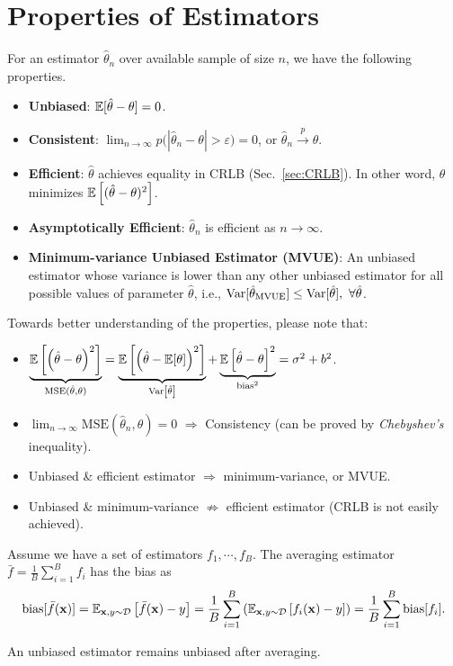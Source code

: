 \section{Properties of Estimators}
For an estimator $\hat{\theta}_n$ over available sample of size $n$, we have the following properties.
\begin{itemize}
	\item \textbf{Unbiased}: $\mathbb{E}[\hat{\theta} - \theta] = 0$.
	\item \textbf{Consistent}: $\displaystyle \lim _{n\to \infty } p{\big (}|\hat{\theta}_{n}-\theta |>\varepsilon {\big )}=0$, or $\hat{\theta}_{n} \overset{p}{\longrightarrow} \theta $.
	\item \textbf{Efficient}: $\hat{\theta}$ achieves equality in CRLB (Sec.~\ref{sec:CRLB}). In other word, $\hat{\theta}$ minimizes $\mathbb{E}\left[(\hat{\theta} - \theta)^2\right]$.
	\item \textbf{Asymptotically Efficient}: $\hat{\theta}_n$ is efficient as $ n \rightarrow \infty$.
	\item \textbf{Minimum-variance Unbiased Estimator (MVUE)}: An unbiased estimator whose variance is lower than any other unbiased estimator for all possible values of parameter $\hat{\theta}$, i.e., $\mathrm{Var}[\hat{\theta}_{\rm MVUE}] \leq \mathrm{Var}[\hat{\theta}],\ \forall \hat{\theta}$.
\end{itemize}
Towards better understanding of the properties, please note that:
\begin{itemize}
	\item $ \underbrace{\mathbb{E}\left[\left(\hat{\theta} - \theta\right)^2\right]}_{\mathrm{MSE}(\hat{\theta}, \theta)} = \underbrace{\mathbb{E}\left[\left(\hat{\theta} - \mathbb{E}[\theta]\right)^2\right]}_{\mathrm{Var}\left[\hat{\theta}\right]} + \underbrace{\mathbb{E}\left[\hat{\theta} - \theta\right]^2}_{\text{bias}^2} = \sigma^2 + b^2$. 
	\item $\lim_{n \rightarrow \infty} \mathrm{MSE}\left(\hat{\theta}_n, \theta\right) = 0$ $\Longrightarrow$ Consistency (can be proved by \emph{Chebyshev's} inequality).
	\item Unbiased \& efficient estimator $\Longrightarrow$ minimum-variance, or MVUE.
	\item Unbiased \& minimum-variance $\not\Rightarrow$ efficient estimator (CRLB is not easily achieved). 
\end{itemize}

\begin{property}
	Assume we have a set of estimators $f_1, \cdots, f_B$. The averaging estimator $\bar{f} = \frac{1}{B} \sum_{i=1}^B f_i$ has the bias as
\begin{equation}
	\mathrm{bias}[\bar{f}(\mathbf{x})] = \mathbb{E}_{\mathbf{x}, y \sim \mathcal{D}}\left[ \bar{f}(\mathbf{x}) - y \right] = \frac{1}{B} \sum_{i=1}^B \left(\mathbb{E}_{\mathbf{x}, y \sim \mathcal{D}}\left[ {f_i}(\mathbf{x}) - y \right]  \right) =  \frac{1}{B} \sum_{i=1}^B \mathrm{bias}[{f}_i].
\end{equation}
\end{property}
\remark An unbiased estimator remains unbiased after averaging.

